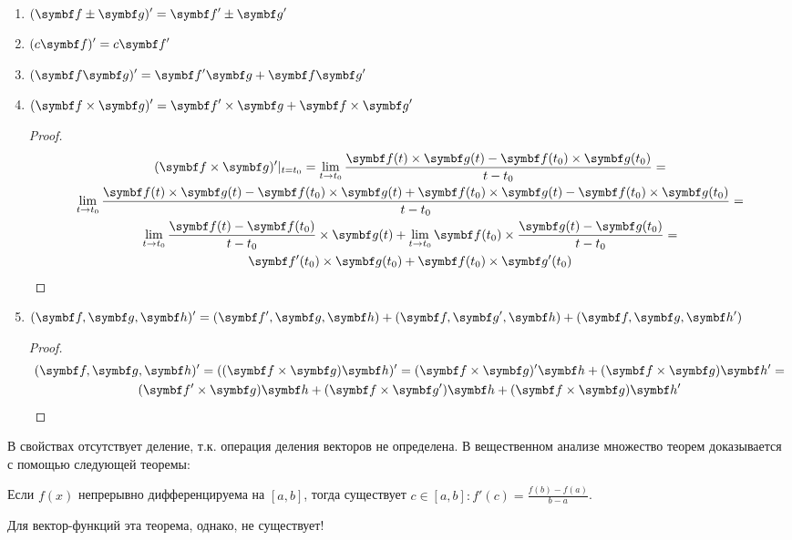 \documentclass[main]{subfiles}
\begin{document}
\begin{propertylist}
    \

    \begin{enumerate}
        \item $\displaystyle (\vf \pm \vg)' = \vf' \pm \vg'$
        \item $\displaystyle (c\vf)' = c\vf'$
        \item $\displaystyle (\vf \vg)' = \vf'\vg + \vf \vg'$
        \item $\displaystyle (\vf \times \vg)' = \vf' \times \vg + \vf \times \vg'$
              \begin{proof}
                  \begin{multline*}
                      (\vf \times \vg)'\rvert_{t=t_0} = \lim_{t \to t_0} \frac{\vf(t) \times \vg(t) - \vf(t_0) \times \vg(t_0)}{t - t_0} = \\
                      \lim_{t \to t_0} \frac{\vf(t) \times \vg(t) - \vf(t_0) \times \vg(t) + \vf(t_0) \times \vg(t) - \vf(t_0) \times \vg(t_0)}{t - t_0} = \\
                      \lim_{t \to t_0} \frac{\vf(t) - \vf(t_0)}{t - t_0} \times \vg(t) + \lim_{t \to t_0} \vf(t_0) \times \frac{\vg(t) - \vg(t_0)}{t- t_0} = \\
                      \vf'(t_0) \times \vg(t_0) + \vf(t_0) \times \vg'(t_0)
                  \end{multline*}
              \end{proof}
        \item $\displaystyle (\vf,\vg,\vh)' = (\vf',\vg,\vh) + (\vf,\vg',\vh) + (\vf,\vg,\vh')$
              \begin{proof}
                  \begin{multline*}
                      (\vf,\vg,\vh)' = ((\vf \times \vg) \vh)' = (\vf \times \vg)' \vh + (\vf \times \vg) \vh'=\\
                      (\vf' \times \vg) \vh + (\vf \times \vg') \vh + (\vf \times \vg) \vh'
                  \end{multline*}
              \end{proof}
    \end{enumerate}
\end{propertylist}

В свойствах отсутствует деление, т.к. операция деления векторов не определена.
В вещественном анализе множество теорем доказывается с помощью следующей теоремы:
\begin{theorem*}[Лагранжа]
    Если $f(x)$ непрерывно дифференцируема на $[a,b]$, тогда существует $c \in [a,b] : f'(c) = \frac{f(b) - f(a)}{b-a}$.
\end{theorem*}
Для вектор-функций эта теорема, однако, не существует!
\end{document}
